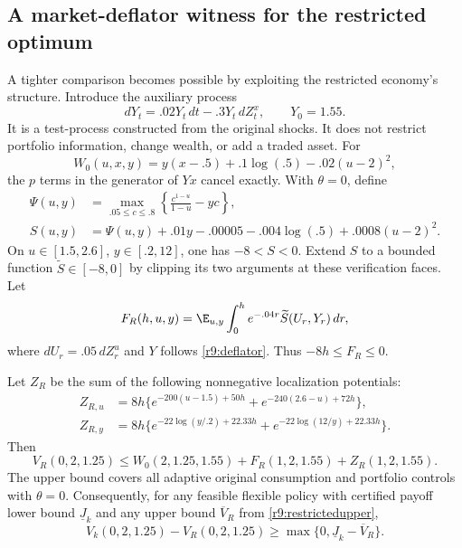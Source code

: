 \subsection{A market-deflator witness for the restricted optimum}\label{r9:dual}
A tighter comparison becomes possible by exploiting the restricted economy's structure. Introduce the auxiliary process
\begin{equation}
 dY_t=.02Y_t\,dt-.3Y_t\,dZ^x_t,\qquad Y_0=1.55.\label{r9:deflator}
\end{equation}
It is a test-process constructed from the original shocks. It does not restrict portfolio information, change wealth, or add a traded asset. For
\[
 W_0(u,x,y)=y(x-.5)+.1\log(.5)-.02(u-2)^2,
\]
the $p$ terms in the generator of $Yx$ cancel exactly. With $\theta=0$, define
\begin{align}
 \Psi(u,y)&=\max_{.05\leq c\leq.8}\left\{\frac{c^{1-u}}{1-u}-yc\right\},\\
 S(u,y)&=\Psi(u,y)+.01y-.00005-.004\log(.5)+.0008(u-2)^2.\label{r9:dualsource}
\end{align}
On $u\in[1.5,2.6]$, $y\in[.2,12]$, one has $-8<S<0$. Extend $S$ to a bounded function $\widetilde S\in[-8,0]$ by clipping its two arguments at these verification faces. Let
\begin{equation}
 F_R(h,u,y)=\E_{u,y}\int_0^h e^{-.04r}\widetilde S(U_r,Y_r)\,dr,\label{r9:restrictedpotential}
\end{equation}
where $dU_r=.05\,dZ^u_r$ and $Y$ follows \eqref{r9:deflator}. Thus $-8h\leq F_R\leq0$.

\begin{theorem}\label{r9:restricted}
Let $Z_R$ be the sum of the following nonnegative localization potentials:
\begin{align}
 Z_{R,u}&=8h\{e^{-200(u-1.5)+50h}+e^{-240(2.6-u)+72h}\},\\
 Z_{R,y}&=8h\{e^{-22\log(y/.2)+22.33h}
                         +e^{-22\log(12/y)+22.33h}\}.
\end{align}
Then
\begin{equation}
 V_R(0,2,1.25)\leq W_0(2,1.25,1.55)+F_R(1,2,1.55)+Z_R(1,2,1.55).
 \label{r9:restrictedupper}
\end{equation}
The upper bound covers all adaptive original consumption and portfolio controls with $\theta=0$. Consequently, for any feasible flexible policy with certified payoff lower bound $\underline J_k$ and any upper bound $\overline V_R$ from \eqref{r9:restrictedupper},
\begin{equation}
 V_k(0,2,1.25)-V_R(0,2,1.25)\geq\max\{0,\underline J_k-\overline V_R\}.\label{r9:accesslower}
\end{equation}
\end{theorem}

